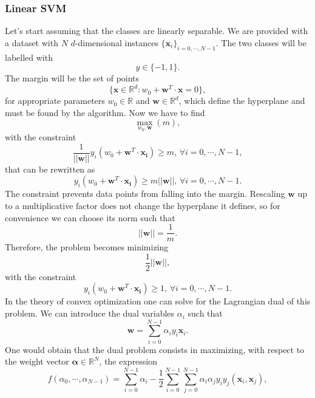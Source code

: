 \documentclass[a4paper]{article}
\begin{document}
\subsubsection{Linear SVM}
Let's start assuming that the classes are linearly separable. We are provided with a dataset with $N$ $d$-dimensional instances $\{\mathbf{x}_i\}_{i=0,\cdots, N-1}$. The two classes will be labelled with $$y\in \{-1,1\}.$$ The margin will be the set of points 
\begin{equation}
    \{\mathbf{x}\in\mathbb{R}^d: w_0+\mathbf{w}^T\cdot \mathbf{x}=0\},
    \label{margin definition}
\end{equation}  
for appropriate parameters $w_0\in \mathbb{R}$ and $\mathbf{w}\in \mathbb{R}^d$, which define the hyperplane and must be found by the algorithm. Now we have to find $$\max_{w_0, \mathbf{w}}(m),$$ with the constraint 
\begin{equation}
    \frac{1}{||\mathbf{w}||}y_i(w_0+\mathbf{w}^T\cdot \mathbf{x_i})\geq m, \, \forall i=0,\cdots, N-1,
\end{equation}
that can be rewritten as 
\begin{equation}
    y_i(w_0+\mathbf{w}^T\cdot \mathbf{x_i})\geq m||\mathbf{w}||, \, \forall i=0,\cdots, N-1.
\end{equation}
The constraint prevents data points from falling into the margin. Rescaling $\mathbf{w}$ up to a multiplicative factor does not change the hyperplane it defines, so for convenience we can choose its norm such that 
\begin{equation}
    ||\mathbf{w}||=\frac{1}{m}.
\end{equation}
Therefore, the problem becomes minimizing
$$\frac{1}{2}||\mathbf{w}||, $$ with the constraint 
\begin{equation}
    y_i(w_0+\mathbf{w}^T\cdot \mathbf{x_i})\geq 1, \, \forall i=0,\cdots, N-1.
    \label{constraint hard margin}
\end{equation}
In the theory of convex optimization one can solve for the Lagrangian dual of this problem. We can introduce the dual variables $\alpha_i$ such that
\begin{equation}
    \mathbf{w}=\sum_{i=0}^{N-1}\alpha_iy_i\mathbf{x}_i.
    \label{alpha def}
\end{equation} 
One would obtain that the dual problem consists in maximizing, with respect to the weight vector $\mathbf{\alpha}\in\mathbb{R}^N$, the expression 
\begin{equation}
    f(\alpha_0,\cdots,\alpha_{N-1})=\sum_{i=0}^{N-1} \alpha_i-\frac{1}{2}\sum_{i=0}^{N-1}\sum_{j=0}^{N-1}\alpha_i\alpha_jy_iy_j(\mathbf{x}_i,\mathbf{x}_j),
    \label{dual problem SVM}
\end{equation}
\end{document}

